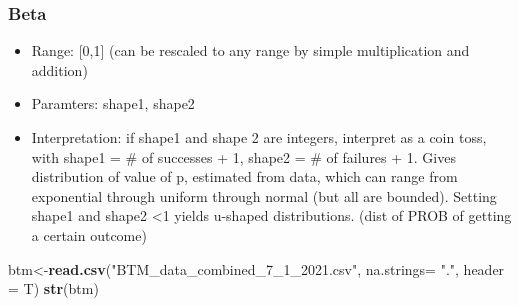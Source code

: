 \documentclass[]{article}
\newenvironment{Shaded}{\begin{snugshade}}{\end{snugshade}}
\newcommand{\KeywordTok}[1]{\textcolor[rgb]{0.13,0.29,0.53}{\textbf{#1}}}
\newcommand{\DataTypeTok}[1]{\textcolor[rgb]{0.13,0.29,0.53}{#1}}
\newcommand{\StringTok}[1]{\textcolor[rgb]{0.31,0.60,0.02}{#1}}
\newcommand{\NormalTok}[1]{#1}
\providecommand{\tightlist}{%
  \setlength{\itemsep}{0pt}\setlength{\parskip}{0pt}}
\begin{document}
\subsubsection{\texorpdfstring{\textbf{Beta}}{Beta}}\label{beta}

\begin{itemize}
\tightlist
\item
  Range: {[}0,1{]} (can be rescaled to any range by simple
  multiplication and addition)
\item
  Paramters: shape1, shape2
\item
  Interpretation: if shape1 and shape 2 are integers, interpret as a
  coin toss, with shape1 = \# of successes + 1, shape2 = \# of failures
  + 1. Gives distribution of value of p, estimated from data, which can
  range from exponential through uniform through normal (but all are
  bounded). Setting shape1 and shape2 \textless{}1 yields u-shaped
  distributions. (dist of PROB of getting a certain outcome)
\end{itemize}

\begin{Shaded}
\begin{Highlighting}[]
\NormalTok{btm<-}\KeywordTok{read.csv}\NormalTok{(}\StringTok{"BTM_data_combined_7_1_2021.csv"}\NormalTok{, }\DataTypeTok{na.strings=} \StringTok{"."}\NormalTok{, }\DataTypeTok{header =}\NormalTok{ T)}
\KeywordTok{str}\NormalTok{(btm)}
\end{Highlighting}
\end{Shaded}
\end{document}
